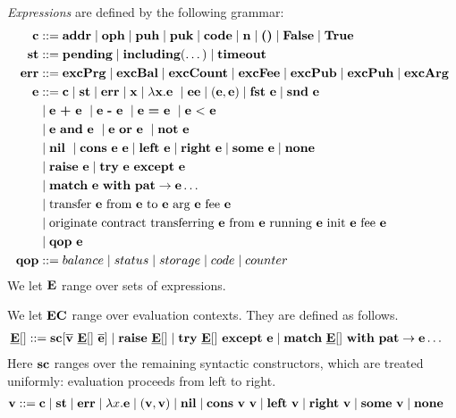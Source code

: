 \documentclass[a4paper]{llncs}
\begin{document}
\begin{definition}%
\emph{Expressions} are defined by the following grammar:
\begin{align*}
  \CONSTANT & ::= \ADDR \mid \OPH \mid \PUH \mid\PUK \mid \CODE \mid
              \NTEZ \mid \SUNIT \mid \FALSE \mid \TRUE \\
  \STATUS & ::= \STATUSPENDING \mid \STATUSINCLUDING (\dots) \mid
            \STATUSTIMEOUT \\
  \ERROR &::= \ERRPRG \mid \ERRBAL \mid \ERRCOUNT \mid \ERRFEE \mid
           \ERRPUK \mid \ERRPUH \mid \ERRARG\\
	\EXPR & :: =  \CONSTANT \mid \STATUS \mid \ERROR \mid \VARIABLE \mid \lambda \VARIABLE. \EXPR\ 
	\mid \EXPR\EXPR \mid (\EXPR,\EXPR) \mid \FST\ \EXPR \mid \SND\ \EXPR 	%
	\\&\mid \EXPR\ \PLUS\ \EXPR\ \mid \EXPR\ \MINUS\ \EXPR\ \mid \EXPR\ \EQUAL\ \EXPR\ \mid \EXPR\ \LESS\ \EXPR
	\\&\mid \EXPR\ \AND\ \EXPR\ \mid \EXPR\ \OR\ \EXPR\ \mid \NOT\ \EXPR
  \\&\mid \NIL\ \mid \CONS\ \EXPR\ \EXPR \mid \LEFT\ \EXPR \mid\RIGHT\
  \EXPR \mid \SOME\ \EXPR \mid \NONE
  \\& \mid \RAISE\ \EXPR \mid \TRY\ \EXPR\ \EXCEPT\ \EXPR
  \\& \mid \MATCH\ \EXPR\ \WITH\ \PATTERN\to\EXPR \dots
  \\& \mid \TRANSFER[\EXPR]\EXPR\EXPR\EXPR\EXPR
  \\& \mid \ORIGINATE\EXPR\EXPR\EXPR\EXPR\EXPR
  \\&\mid \QOP\  \EXPR\\
  \QOP & ::= balance \mid status \mid storage \mid code \mid counter
\end{align*}
We let $\textbf{E}$ range over sets of expressions.

We let $\textbf{EC}$ range over evaluation contexts. They are defined as
follows.
\begin{align*}
  \underline{\textbf{E}}[] & :: = \textbf{sc}[\overline{\textbf{v}}\ \underline{\textbf{E}}[]\ \overline{\textbf{e}}] \mid \textbf{raise}\ \underline{\textbf{E}}[] \mid \textbf{try}\ \underline{\textbf{E}}[]\ \textbf{except}\ \textbf{e}
  \mid \textbf{match}\ \underline{\textbf{E}}[]\ \textbf{with}\ \textbf{pat}\to\textbf{e} \dots
\end{align*}
Here $\textbf{sc}$ ranges over the remaining syntactic constructors, which are
treated uniformly: evaluation proceeds from left to right.
\begin{align*}
  \textbf{v} & ::= \textbf{c} \mid \textbf{st} \mid \textbf{err} \mid \lambda x.\textbf{e} \mid(\textbf{v}, \textbf{v}) \mid
         \textbf{nil} \mid \textbf{cons}\ \textbf{v}\ \textbf{v} \mid \textbf{left}\ \textbf{v} \mid \textbf{right}\
         \textbf{v} \mid \textbf{some}\ \textbf{v}\mid \textbf{none}
\end{align*}
\end{definition}
\end{document}
